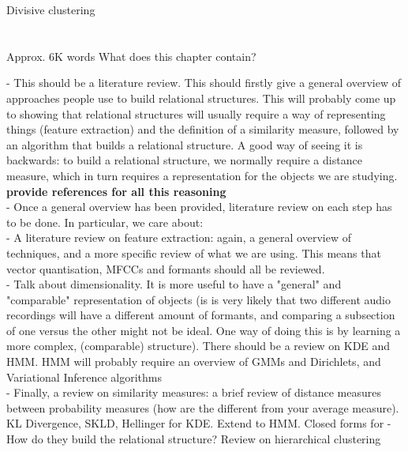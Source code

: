 \documentclass[../main.tex]{subfiles}
\begin{document}
\cite{hastie2008}
Divisive clustering
\section{}





Approx. 6K words
What does this chapter contain?

- This should be a literature review. This should firstly give a general overview of approaches people use to build relational structures. This will probably come up to showing that relational structures will usually require a way of representing things (feature extraction) and the definition of a similarity measure, followed by an algorithm that builds a relational structure. A good way of seeing it is backwards: to build a relational structure, we normally require a distance measure, which in turn requires a representation for the objects we are studying. \textbf{provide references for all this reasoning}\\
- Once a general overview has been provided, literature review on each step has to be done. In particular, we care about:\\
- A literature review on feature extraction: again, a general overview of techniques, and a more specific review of what we are using. This means that vector quantisation, MFCCs and formants should all be reviewed.\\
- Talk about dimensionality. It is more useful to have a "general" and "comparable" representation of objects (is is very likely that two different audio recordings will have a different amount of formants, and comparing a subsection of one versus the other might not be ideal. One way of doing this is by learning a more complex, (comparable) structure). There should be a review on KDE and HMM. HMM will probably require an overview of GMMs and Dirichlets, and Variational Inference algorithms\\
- Finally, a review on similarity measures: a brief review of distance measures between probability measures (how are the different from your average measure). KL Divergence, SKLD, Hellinger for KDE. Extend to HMM. Closed forms for 
- How do they build the relational structure? Review on hierarchical clustering
\end{document}
